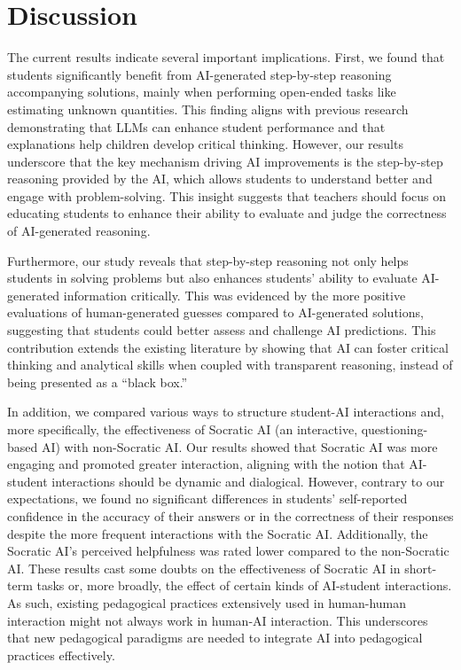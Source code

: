 \documentclass[
  11pt,
]{article}
\begin{document}
\section{Discussion}\label{discussion}

The current results indicate several important implications. First, we found that students significantly benefit from AI-generated step-by-step reasoning accompanying solutions, mainly when performing open-ended tasks like estimating unknown quantities. This finding aligns with previous research demonstrating that LLMs can enhance student performance and that explanations help children develop critical thinking. However, our results underscore that the key mechanism driving AI improvements is the step-by-step reasoning provided by the AI, which allows students to understand better and engage with problem-solving. This insight suggests that teachers should focus on educating students to enhance their ability to evaluate and judge the correctness of AI-generated reasoning.

Furthermore, our study reveals that step-by-step reasoning not only helps students in solving problems but also enhances students' ability to evaluate AI-generated information critically. This was evidenced by the more positive evaluations of human-generated guesses compared to AI-generated solutions, suggesting that students could better assess and challenge AI predictions. This contribution extends the existing literature by showing that AI can foster critical thinking and analytical skills when coupled with transparent reasoning, instead of being presented as a ``black box.''

In addition, we compared various ways to structure student-AI interactions and, more specifically, the effectiveness of Socratic AI (an interactive, questioning-based AI) with non-Socratic AI. Our results showed that Socratic AI was more engaging and promoted greater interaction, aligning with the notion that AI-student interactions should be dynamic and dialogical. However, contrary to our expectations, we found no significant differences in students' self-reported confidence in the accuracy of their answers or in the correctness of their responses despite the more frequent interactions with the Socratic AI. Additionally, the Socratic AI's perceived helpfulness was rated lower compared to the non-Socratic AI. These results cast some doubts on the effectiveness of Socratic AI in short-term tasks or, more broadly, the effect of certain kinds of AI-student interactions. As such, existing pedagogical practices extensively used in human-human interaction might not always work in human-AI interaction. This underscores that new pedagogical paradigms are needed to integrate AI into pedagogical practices effectively.
\end{document}
